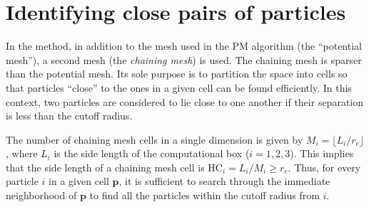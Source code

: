 \section{Identifying close pairs of particles}
In the \PThreeM{} method, in addition to the mesh used in the PM algorithm (the ``potential mesh''), a second mesh (the \textit{chaining mesh}) is used.
The chaining mesh is sparser than the potential mesh.
Its sole purpose is to partition the space into cells so that particles ``close'' to the ones in a given cell can be found efficiently.
In this context, two particles are considered to lie close to one another if their separation is less than the cutoff radius.

The number of chaining mesh cells in a single dimension is given by $M_i = \lfloor L_i / r_e \rfloor$, where $L_i$ is the side length of the computational box ($i=1,2,3$).
This implies that the side length of a chaining mesh cell is $\text{HC}_i = L_i / M_i \geq r_e$.
Thus, for every particle $i$ in a given cell $\mathbf{p}$, it is sufficient to search through the immediate neighborhood of $\mathbf{p}$ to find all the particles within the cutoff radius from $i$.

